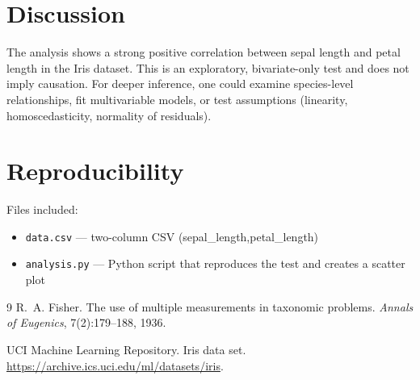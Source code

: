 \documentclass[11pt]{article}
\begin{document}
\section{Discussion}
The analysis shows a strong positive correlation between sepal length
and petal length in the Iris dataset. This is an exploratory,
bivariate-only test and does not imply causation. For deeper inference,
one could examine species-level relationships, fit multivariable models,
or test assumptions (linearity, homoscedasticity, normality of residuals).

\section{Reproducibility}
Files included:
\begin{itemize}
  \item \texttt{data.csv} --- two-column CSV (sepal\_length,petal\_length)
  \item \texttt{analysis.py} --- Python script that reproduces the test
        and creates a scatter plot
\end{itemize}

\begin{thebibliography}{9}
R.~A. Fisher.
\newblock The use of multiple measurements in taxonomic problems.
\newblock \emph{Annals of Eugenics}, 7(2):179--188, 1936.

UCI Machine Learning Repository.
\newblock Iris data set.
\newblock \url{https://archive.ics.uci.edu/ml/datasets/iris}.
\end{thebibliography}
\end{document}
